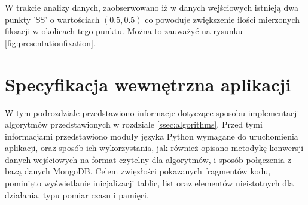 W trakcie analizy danych, zaobserwowano iż w danych wejściowych istnieją dwa punkty 'SS' o wartościach $(0.5,0.5)$ co powoduje zwiększenie ilości mierzonych fiksacji w okolicach tego punktu. Można to zauważyć na rysunku \ref{fig:presentationfixation}.
\section{Specyfikacja wewnętrzna aplikacji}
\label{sec:internal}
W tym podrozdziale przedstawiono informacje dotyczące sposobu implementacji algorytmów przedstawionych w rozdziale \ref{ssec:algorithms}. Przed tymi informacjami przedstawiono moduły języka Python wymagane do uruchomienia aplikacji, oraz sposób ich wykorzystania, jak również opisano metodykę konwersji danych wejściowych na format czytelny dla algorytmów, i sposób połączenia z bazą danych MongoDB. Celem zwięzłości pokazanych fragmentów kodu, pominięto wyświetlanie inicjalizacji tablic, list oraz elementów nieistotnych dla działania, typu pomiar czasu i pamięci.
